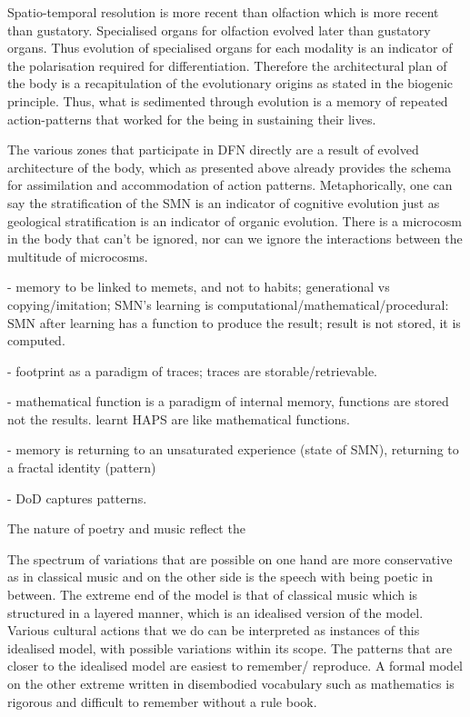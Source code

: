 Spatio-temporal resolution is more recent than olfaction which is more recent than gustatory. Specialised organs for olfaction evolved later than gustatory organs. Thus evolution of specialised organs for each modality is an indicator of the polarisation required for differentiation. Therefore the architectural plan of the body is a recapitulation of the evolutionary origins as stated in the biogenic principle. Thus, what is sedimented through evolution is a memory of repeated action-patterns that worked for the being in sustaining their lives.

The various zones that participate in DFN directly are a result of evolved architecture of the body, which as presented above already provides the schema for assimilation and accommodation of action patterns. Metaphorically, one can say the stratification of the SMN is an indicator of cognitive evolution just as geological stratification is an indicator of organic evolution. There is a microcosm in the body that can't be ignored, nor can we ignore the interactions between the multitude of microcosms.




- memory to be linked to memets, and not to habits; generational vs copying/imitation; SMN's learning is computational/mathematical/procedural: SMN after learning has a function to produce the result; result is not stored, it is computed. 

- footprint as a paradigm of traces; traces  are storable/retrievable.   

- mathematical function is a paradigm of internal memory, functions are stored not the results. learnt HAPS are like mathematical functions.

- memory is returning to an unsaturated experience (state of SMN), returning to a fractal identity (pattern) 

- DoD captures patterns. 

The nature of poetry and music reflect the 

The spectrum of variations that are possible on one hand are more conservative as in classical music and on the other side is the speech with being poetic in between. The extreme end of the model is that of classical music which is structured in a layered manner, which is an idealised version of the model. Various cultural actions that we do can be interpreted as instances of this idealised model, with possible variations within its scope. The patterns that are closer to the idealised model are easiest to remember/ reproduce. A formal model on the other extreme written in disembodied vocabulary such as mathematics is rigorous and difficult to remember without a rule book.

